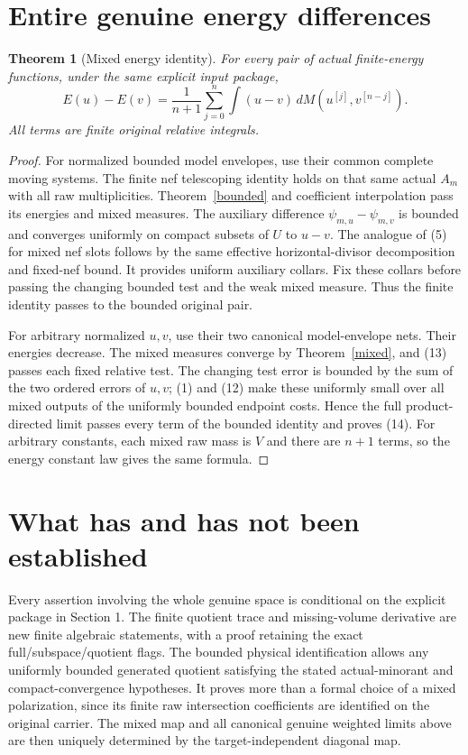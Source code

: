 \documentclass[11pt]{article}
\newtheorem{theorem}{Theorem}
\begin{document}
\section{Entire genuine energy differences}
\begin{theorem}[Mixed energy identity]
For every pair of actual finite-energy functions, under the same
explicit input package,
\[
 E(u)-E(v)=\frac1{n+1}\sum_{j=0}^{n}
       \int(u-v)\,dM(u^{[j]},v^{[n-j]}).                \tag{14}
\]
All terms are finite original relative integrals.
\end{theorem}
\begin{proof}
For normalized bounded model envelopes, use their common
complete moving systems. The finite nef telescoping identity
holds on that same actual $A_m$ with all raw multiplicities.
Theorem~\ref{bounded} and coefficient interpolation pass its
energies and mixed measures.
The auxiliary difference $\psi_{m,u}-\psi_{m,v}$ is bounded
and converges uniformly on compact subsets of $U$ to $u-v$.
The analogue of (5) for mixed nef slots follows by the same
effective horizontal-divisor decomposition and fixed-nef bound.
It provides uniform auxiliary collars. Fix these collars before
passing the changing bounded test and the weak mixed measure.
Thus the finite identity passes to the bounded original pair.

For arbitrary normalized $u,v$, use their two canonical
model-envelope nets. Their energies decrease.
The mixed measures converge by Theorem~\ref{mixed}, and (13)
passes each fixed relative test. The changing test error is
bounded by the sum of the two ordered errors of $u,v$;
(1) and (12) make these uniformly small over all mixed outputs
of the uniformly bounded endpoint costs.
Hence the full product-directed limit passes every term of the
bounded identity and proves (14).
For arbitrary constants, each mixed raw mass is $V$ and there
are $n+1$ terms, so the energy constant law gives the same formula.
\end{proof}

\section{What has and has not been established}
Every assertion involving the whole genuine space is conditional
on the explicit package in Section 1.
The finite quotient trace and missing-volume derivative are new
finite algebraic statements, with a proof retaining the exact
full/subspace/quotient flags.
The bounded physical identification allows any uniformly bounded
generated quotient satisfying the stated actual-minorant and
compact-convergence hypotheses. It proves more than a formal
choice of a mixed polarization, since its finite raw intersection
coefficients are identified on the original carrier.
The mixed map and all canonical genuine weighted limits above
are then uniquely determined by the target-independent diagonal map.
\end{document}
